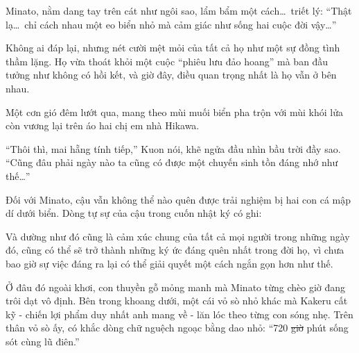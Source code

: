 \documentclass[../main.tex]{subfiles}
\begin{document}
Minato, nằm dang tay trên cát như ngôi sao, lẩm bẩm một cách\dots\ triết lý: ``Thật lạ\dots\ chỉ cách nhau một eo biển nhỏ mà cảm giác như sống hai cuộc đời vậy\dots''

Không ai đáp lại, nhưng nét cười mệt mỏi của tất cả họ như một sự đồng tình thầm lặng. Họ vừa thoát khỏi một cuộc ``phiêu lưu đảo hoang'' mà ban đầu tưởng như không có hồi kết, và giờ đây, điều quan trọng nhất là họ vẫn ở bên nhau.

Một cơn gió đêm lướt qua, mang theo mùi muối biển pha trộn với mùi khói lửa còn vương lại trên áo hai chị em nhà Hikawa.

``Thôi thì, mai hẵng tính tiếp,'' Kuon nói, khẽ ngửa đầu nhìn bầu trời đầy sao. ``Cũng đâu phải ngày nào ta cũng có được một chuyến sinh tồn đáng nhớ như thế\dots''

Đối với Minato, cậu vẫn không thể nào quên được trải nghiệm bị hai con cá mập dí dưới biển. Dòng tự sự của cậu trong cuốn nhật ký có ghi:


Và dường như đó cũng là cảm xúc chung của tất cả mọi người trong những ngày đó, cũng có thể sẽ trở thành những ký ức đáng quên nhất trong đời họ, vì chưa bao giờ sự việc đáng ra lại có thể giải quyết một cách ngắn gọn hơn như thế.

Ở đâu đó ngoài khơi, con thuyền gỗ mỏng manh mà Minato từng chèo giờ đang trôi dạt vô định. Bên trong khoang dưới, một cái vỏ sò nhỏ khác mà Kakeru cất kỹ - chiến lợi phẩm duy nhất anh mang về - lăn lóc theo từng con sóng nhẹ. Trên thân vỏ sò ấy, có khắc dòng chữ nguệch ngoạc bằng dao nhỏ: ``720 \sout{giờ} phút sống sót cùng lũ điên.''
\end{document}
